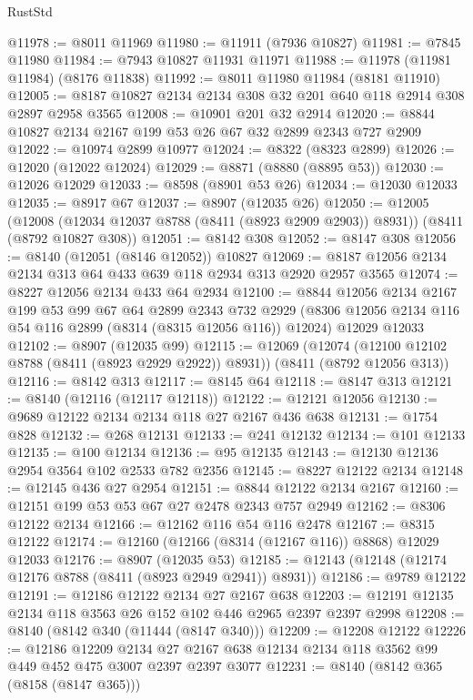 \begin{lexlean}{RustStd}
\begin{coremodule}
@11978 := @8011 @11969
@11980 := @11911 (@7936 @10827)
@11981 := @7845 @11980
@11984 := @7943 @10827 @11931 @11971
@11988 := @11978 (@11981 @11984) (@8176 @11838)
@11992 := @8011 @11980 @11984 (@8181 @11910)
@12005 := @8187 @10827 @2134 @2134 @308 @32 @201 @640 @118 @2914 @308 @2897 @2958 @3565
@12008 := @10901 @201 @32 @2914
@12020 := @8844 @10827 @2134 @2167 @199 @53 @26 @67 @32 @2899 @2343 @727 @2909
@12022 := @10974 @2899 @10977
@12024 := @8322 (@8323 @2899)
@12026 := @12020 (@12022 @12024)
@12029 := @8871 (@8880 (@8895 @53))
@12030 := @12026 @12029
@12033 := @8598 (@8901 @53 @26)
@12034 := @12030 @12033
@12035 := @8917 @67
@12037 := @8907 (@12035 @26)
@12050 := @12005
    (@12008 (@12034 @12037 @8788 (@8411 (@8923 @2909 @2903)) @8931))
    (@8411 (@8792 @10827 @308))
@12051 := @8142 @308
@12052 := @8147 @308
@12056 := @8140 (@12051 (@8146 @12052)) @10827
@12069 := @8187 @12056 @2134 @2134 @313 @64 @433 @639 @118 @2934 @313 @2920 @2957 @3565
@12074 := @8227 @12056 @2134 @433 @64 @2934
@12100 := @8844
    @12056
    @2134
    @2167
    @199
    @53
    @99
    @67
    @64
    @2899
    @2343
    @732
    @2929
    (@8306 @12056 @2134 @116 @54 @116 @2899 (@8314 (@8315 @12056 @116)) @12024)
    @12029
    @12033
@12102 := @8907 (@12035 @99)
@12115 := @12069
    (@12074 (@12100 @12102 @8788 (@8411 (@8923 @2929 @2922)) @8931))
    (@8411 (@8792 @12056 @313))
@12116 := @8142 @313
@12117 := @8145 @64
@12118 := @8147 @313
@12121 := @8140 (@12116 (@12117 @12118))
@12122 := @12121 @12056
@12130 := @9689 @12122 @2134 @2134 @118 @27 @2167 @436 @638
@12131 := @1754 @828
@12132 := @268 @12131
@12133 := @241 @12132
@12134 := @101 @12133
@12135 := @100 @12134
@12136 := @95 @12135
@12143 := @12130 @12136 @2954 @3564 @102 @2533 @782 @2356
@12145 := @8227 @12122 @2134
@12148 := @12145 @436 @27 @2954
@12151 := @8844 @12122 @2134 @2167
@12160 := @12151 @199 @53 @53 @67 @27 @2478 @2343 @757 @2949
@12162 := @8306 @12122 @2134
@12166 := @12162 @116 @54 @116 @2478
@12167 := @8315 @12122
@12174 := @12160 (@12166 (@8314 (@12167 @116)) @8868) @12029 @12033
@12176 := @8907 (@12035 @53)
@12185 := @12143 (@12148 (@12174 @12176 @8788 (@8411 (@8923 @2949 @2941)) @8931))
@12186 := @9789 @12122
@12191 := @12186 @12122 @2134 @27 @2167 @638
@12203 := @12191 @12135 @2134 @118 @3563 @26 @152 @102 @446 @2965 @2397 @2397 @2998
@12208 := @8140 (@8142 @340 (@11444 (@8147 @340)))
@12209 := @12208 @12122
@12226 := @12186
    @12209
    @2134
    @27
    @2167
    @638
    @12134
    @2134
    @118
    @3562
    @99
    @449
    @452
    @475
    @3007
    @2397
    @2397
    @3077
@12231 := @8140 (@8142 @365 (@8158 (@8147 @365)))

\end{coremodule}
\end{lexlean}
